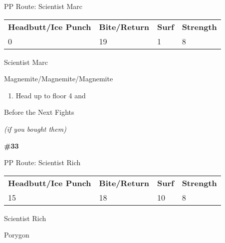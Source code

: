 \begin{paracol}{2}
\switchcolumn*
\begin{misc}{PP Route: Scientist Marc}
	\varwb
	\begin{tabu} to \textwidth {X[6,c] X[5,c] X[4,c] X[4,c]}
		\textbf{Headbutt/Ice Punch} & \textbf{Bite/Return} & \textbf{Surf} & \textbf{Strength}\\ 
		0 & 19 & 1 & 8
	\end{tabu}
	\varwe
\end{misc}

\switchcolumn
\begin{trainer}{Scientist Marc}
	\varwb
	\begin{fightSection}{Magnemite/Magnemite/Magnemite}
		\item {} \surf{} 
	\end{fightSection}
	\varwe
\end{trainer}

\begin{enumerate}[resume]
    \item Head up to floor 4 and 
\end{enumerate}

\begin{menu}{Before the Next Fights}
	\varwb
	\begin{packMenu}
		\item \ether{} \pointRight{} \surf{} 
		\item \calcium{} \textit{(if you bought them)}
		\item \menuHlTwo{(\pointLeft{})} \textbf{\#33 \icePunch{}} \switch{} \headbutt{} 
	\end{packMenu}
	\varwe
\end{menu}

\switchcolumn*
\begin{misc}{PP Route: Scientist Rich}
	\varwb
	\begin{tabu} to \textwidth {X[6,c] X[5,c] X[4,c] X[4,c]}
		\textbf{Headbutt/Ice Punch} & \textbf{Bite/Return} & \textbf{Surf} & \textbf{Strength}\\ 
		15 & 18 & 10 & 8
	\end{tabu}
	\varwe
\end{misc}

\switchcolumn
\begin{trainer}{Scientist Rich}
	\varwb
	\begin{fightSection}{Porygon}
		\item {} \surf
		\item {} \bite
	\end{fightSection}
	\varwe
\end{trainer}


\end{paracol}
